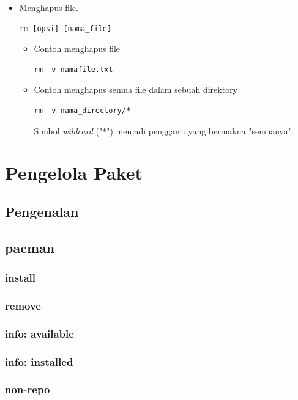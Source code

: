 \documentclass[12pt,]{article}
\begin{document}
\begin{itemize}
		\item Menghapus file.
		\begin{verbatim}
rm [opsi] [nama_file]
		\end{verbatim}
		\begin{itemize}
			\item Contoh menghapus file
			\begin{verbatim}
rm -v namafile.txt
			\end{verbatim}
			
			\item Contoh menghapus semua file dalam sebuah direktory
			\begin{verbatim}
rm -v nama_directory/*
			\end{verbatim}
			Simbol \textit{wildcard} ("*") menjadi pengganti yang bermakna "semuanya".
		\end{itemize}
	\end{itemize}

	\newpage
	\section{Pengelola Paket}
	\subsection{Pengenalan}
	\subsection{pacman}
	\subsubsection{install}
	\subsubsection{remove}
	\subsubsection{info: available}
	\subsubsection{info: installed}
	\subsubsection{non-repo}
\end{document}
